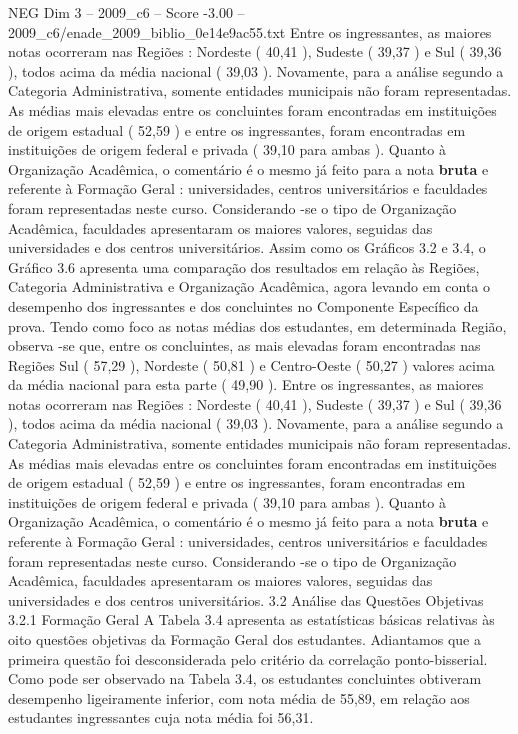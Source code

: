 \begin{textsample}{NEG Dim 3 – 2009\_c6 – Score -3.00 – 2009\_c6/enade\_2009\_biblio\_0e14e9ac55.txt}
Entre os ingressantes, as maiores notas ocorreram nas Regiões : Nordeste ( 40,41 ), Sudeste ( 39,37 ) e Sul ( 39,36 ), todos acima da média nacional ( 39,03 ).
Novamente, para a análise segundo a Categoria Administrativa, somente entidades municipais não foram representadas.
As médias mais elevadas entre os concluintes foram encontradas em instituições de origem estadual ( 52,59 ) e entre os ingressantes, foram encontradas em instituições de origem federal e privada ( 39,10 para ambas ).
Quanto à Organização Acadêmica, o comentário é o mesmo já feito para a nota \textbf{bruta} e referente à Formação Geral : universidades, centros universitários e faculdades foram representadas neste curso.
Considerando -se o tipo de Organização Acadêmica, faculdades apresentaram os maiores valores, seguidas das universidades e dos centros universitários.
Assim como os Gráficos 3.2 e 3.4, o Gráfico 3.6 apresenta uma comparação dos resultados em relação às Regiões, Categoria Administrativa e Organização Acadêmica, agora levando em conta o desempenho dos ingressantes e dos concluintes no Componente Específico da prova.
Tendo como foco as notas médias dos estudantes, em determinada Região, observa -se que, entre os concluintes, as mais elevadas foram encontradas nas Regiões Sul ( 57,29 ), Nordeste ( 50,81 ) e Centro-Oeste ( 50,27 ) valores acima da média nacional para esta parte ( 49,90 ).
Entre os ingressantes, as maiores notas ocorreram nas Regiões : Nordeste ( 40,41 ), Sudeste ( 39,37 ) e Sul ( 39,36 ), todos acima da média nacional ( 39,03 ).
Novamente, para a análise segundo a Categoria Administrativa, somente entidades municipais não foram representadas.
As médias mais elevadas entre os concluintes foram encontradas em instituições de origem estadual ( 52,59 ) e entre os ingressantes, foram encontradas em instituições de origem federal e privada ( 39,10 para ambas ).
Quanto à Organização Acadêmica, o comentário é o mesmo já feito para a nota \textbf{bruta} e referente à Formação Geral : universidades, centros universitários e faculdades foram representadas neste curso.
Considerando -se o tipo de Organização Acadêmica, faculdades apresentaram os maiores valores, seguidas das universidades e dos centros universitários. 3.2 Análise das Questões Objetivas 3.2.1 Formação Geral A Tabela 3.4 apresenta as estatísticas básicas relativas às oito questões objetivas da Formação Geral dos estudantes.
Adiantamos que a primeira questão foi desconsiderada pelo critério da correlação ponto-bisserial.
Como pode ser observado na Tabela 3.4, os estudantes concluintes obtiveram desempenho ligeiramente inferior, com nota média de 55,89, em relação aos estudantes ingressantes cuja nota média foi 56,31.

\end{textsample}
